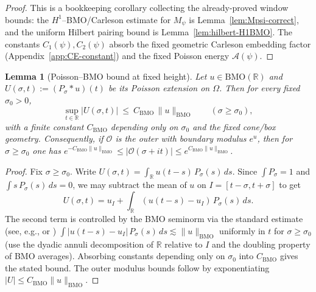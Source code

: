 \documentclass[11pt]{article}
\newtheorem{lemma}[theorem]{Lemma}
\theoremstyle{definition}
\theoremstyle{remark}
\theoremstyle{definition}
\newcommand{\R}{\mathbb{R}}
\begin{document}
\begin{proof}
This is a bookkeeping corollary collecting the already-proved window bounds: the $H^1$--BMO/Carleson estimate for $M_\psi$ is Lemma~\ref{lem:Mpsi-correct}, and the uniform Hilbert pairing bound is Lemma~\ref{lem:hilbert-H1BMO}. The constants $C_1(\psi),C_2(\psi)$ absorb the fixed geometric Carleson embedding factor (Appendix~\ref{app:CE-constant}) and the fixed Poisson energy $\mathcal A(\psi)$.
\end{proof}
\begin{lemma}[Poisson–BMO bound at fixed height]\label{lem:poisson-bmo-strip}
Let $u\in \mathrm{BMO}(\mathbb R)$ and $U(\sigma,t):=(P_\sigma*u)(t)$ be its Poisson extension on $\Omega$. Then for every fixed $\sigma_0>0$,
\[
\sup_{t\in\mathbb R}|U(\sigma,t)|\ \le\ C_{\mathrm{BMO}}\,\|u\|_{\mathrm{BMO}}\qquad(\sigma\ge \sigma_0),
\]
with a finite constant $C_{\mathrm{BMO}}$ depending only on $\sigma_0$ and the fixed cone/box geometry. Consequently, if $\mathcal O$ is the outer with boundary modulus $e^u$, then for $\sigma\ge \sigma_0$ one has $e^{-C_{\mathrm{BMO}}\|u\|_{\mathrm{BMO}}}\le |\mathcal O(\sigma+it)|\le e^{C_{\mathrm{BMO}}\|u\|_{\mathrm{BMO}}}$.
\end{lemma}
\begin{proof}
Fix $\sigma\ge\sigma_0$. Write $U(\sigma,t)=\int_\R u(t-s)\,P_\sigma(s)\,ds$. Since $\int P_\sigma=1$ and $\int s\,P_\sigma(s)\,ds=0$, we may subtract the mean of $u$ on $I=[t-\sigma,t+\sigma]$ to get
\[
  U(\sigma,t)=u_I+\int_\R (u(t-s)-u_I)\,P_\sigma(s)\,ds.
\]
The second term is controlled by the BMO seminorm via the standard estimate (see, e.g., \cite[Ch.~IV]{SteinSingInt} or \cite[Ch.~IV]{Garnett})
\(\int |u(t-s)-u_I|\,P_\sigma(s)\,ds\lesssim \|u\|_{\mathrm{BMO}}\)
uniformly in $t$ for $\sigma\ge\sigma_0$ (use the dyadic annuli decomposition of $\R$ relative to $I$ and the doubling property of BMO averages). Absorbing constants depending only on $\sigma_0$ into $C_{\mathrm{BMO}}$ gives the stated bound. The outer modulus bounds follow by exponentiating $|U|\le C_{\mathrm{BMO}}\|u\|_{\mathrm{BMO}}$.
\end{proof}
\end{document}
